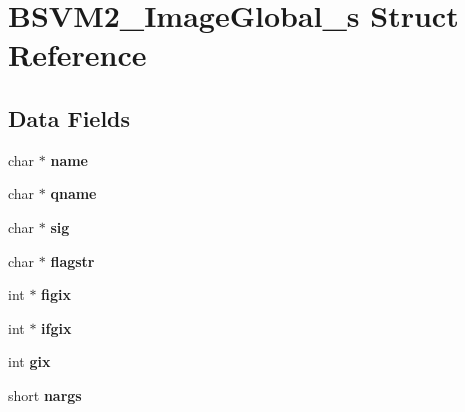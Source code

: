 \hypertarget{structBSVM2__ImageGlobal__s}{\section{B\-S\-V\-M2\-\_\-\-Image\-Global\-\_\-s Struct Reference}
\label{structBSVM2__ImageGlobal__s}
}
\subsection*{Data Fields}
\begin{DoxyCompactItemize}
\item 
\hypertarget{structBSVM2__ImageGlobal__s_a872602b017517f4e5f56feced7141a3c}{char $\ast$ {\bfseries name}}\label{structBSVM2__ImageGlobal__s_a872602b017517f4e5f56feced7141a3c}

\item 
\hypertarget{structBSVM2__ImageGlobal__s_ad6cebb9236996c94742e80ddd2a77eab}{char $\ast$ {\bfseries qname}}\label{structBSVM2__ImageGlobal__s_ad6cebb9236996c94742e80ddd2a77eab}

\item 
\hypertarget{structBSVM2__ImageGlobal__s_a361f491393aa813d57e181c64125db4b}{char $\ast$ {\bfseries sig}}\label{structBSVM2__ImageGlobal__s_a361f491393aa813d57e181c64125db4b}

\item 
\hypertarget{structBSVM2__ImageGlobal__s_a0bc3143b1fe6e89b51352e7a1b81a9d7}{char $\ast$ {\bfseries flagstr}}\label{structBSVM2__ImageGlobal__s_a0bc3143b1fe6e89b51352e7a1b81a9d7}

\item 
\hypertarget{structBSVM2__ImageGlobal__s_a4c72165fa61a0f41319d0b5bea6eee87}{int $\ast$ {\bfseries figix}}\label{structBSVM2__ImageGlobal__s_a4c72165fa61a0f41319d0b5bea6eee87}

\item 
\hypertarget{structBSVM2__ImageGlobal__s_a1501ff916348791ffa978748f46ce3fb}{int $\ast$ {\bfseries ifgix}}\label{structBSVM2__ImageGlobal__s_a1501ff916348791ffa978748f46ce3fb}

\item 
\hypertarget{structBSVM2__ImageGlobal__s_aec1896f879de9c5f38516021222e0d76}{int {\bfseries gix}}\label{structBSVM2__ImageGlobal__s_aec1896f879de9c5f38516021222e0d76}

\item 
\hypertarget{structBSVM2__ImageGlobal__s_af949da026c371771fa8c141e70680bb3}{short {\bfseries nargs}}\label{structBSVM2__ImageGlobal__s_af949da026c371771fa8c141e70680bb3}


\end{DoxyCompactItemize}
